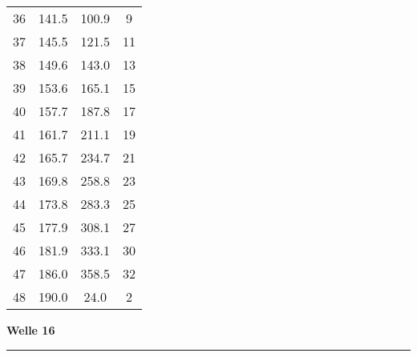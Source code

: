 \documentclass[10pt, a4paper]{article}
\begin{document}
\begin{center}
\begin{tabular}{c|c|c|c}
		36 & 141.5 & 100.9 & 9 \\
		37 & 145.5 & 121.5 & 11 \\
		38 & 149.6 & 143.0 & 13 \\
		39 & 153.6 & 165.1 & 15 \\
		40 & 157.7 & 187.8 & 17 \\
		41 & 161.7 & 211.1 & 19 \\
		42 & 165.7 & 234.7 & 21 \\
		43 & 169.8 & 258.8 & 23 \\
		44 & 173.8 & 283.3 & 25 \\
		45 & 177.9 & 308.1 & 27 \\
		46 & 181.9 & 333.1 & 30 \\
		47 & 186.0 & 358.5 & 32 \\
		48 & 190.0 & 24.0 & 2 \\
	\end{tabular}
\end{center}
\newpage
\centerline{{\bf Welle 16} }
\rule{1.0\textwidth}{0.5mm}
\end{document}
